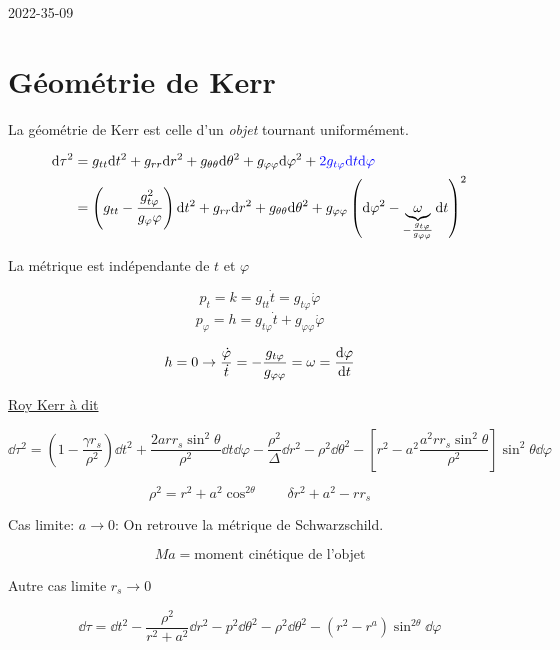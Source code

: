 


2022-35-09


\section*{Géométrie de Kerr}

La géométrie de Kerr est celle d'un \textit{objet} tournant uniformément.


\begin{align*}
	\dd \tau ^2 &= g_{tt} \dd t^{2}+ g_{rr} \dd r^{2}+ g_{\theta\theta} \dd \theta^{2}+ g_{\varphi\varphi}\dd \varphi^{2}+ \textcolor{blue}{2g_{t\varphi}  \dd t \dd \varphi}\\ 
							&= \left( g_{tt}- \frac{g_{t\varphi}^{2}}{g_\varphi\varphi} \right)   \dd t^{2}+ g_{rr} \dd r^{2}+ g_{\theta\theta} \dd \theta^{2}+ g_{\varphi\varphi}\left( \dd \varphi^{2} -\underbrace{\omega}_{- \frac{g_{t\varphi }}{g_{\varphi\varphi} } }   \dd t \right)^2 \\ 
\end{align*}

La métrique est indépendante de $t$ et $\varphi$  

\[ p_t = k = g_{tt} \dot t = g_{t\varphi} \dot \varphi \] 
\[ p_{\varphi} = h = g_{t\varphi} \dot t + g_{\varphi\varphi} \dot \varphi \] 

\begin{tcolorbox}[title=Entraînement des repères]

	\[ h=0 \to \frac{\dot \varphi}{\dot t} = - \frac{g_{t\varphi} }{g_{\varphi\varphi} } = \omega = \dv{\varphi}{t}  \] 
\end{tcolorbox}

\underline{Roy Kerr à dit} 

\[ \dd \tau^{2} = \left( 1 - \frac{\gamma r_{s}}{\rho^2}  \right)  \dd t^{2} + \frac{2a r r_s \sin^{2}\theta }{\rho^2} \dd t \dd \varphi - \frac{\rho^2}{\Delta} \dd r^{2}- \rho^{2}\dd \theta^{2} - \left[ r^{2}- a^{2}\frac{a^{2}r r_s \sin^2\theta }{\rho^2}  \right] \sin^{2}\theta \dd \varphi	\] 



\[ \rho^{2}= r^{2} +a^{2}\cos^{2\theta} \qquad \delta r^{2}+ a^{2}-r r_s  \] 


Cas limite: $ a \to 0 $: On retrouve la métrique de Schwarzschild.

\[ Ma = \text{moment cinétique de l'objet}  \] 


Autre cas limite $r_s \to 0$ 


\[ \dd \tau = \dd t^{2}- \frac{\rho^2}{r^2+a^2} \dd r^{2}- p^{2}\dd\theta^{2} - \rho^{2}\dd \theta^{2}- \left( r^{2}-r^{a} \right) \sin^{2\theta}\dd\varphi   \] 



